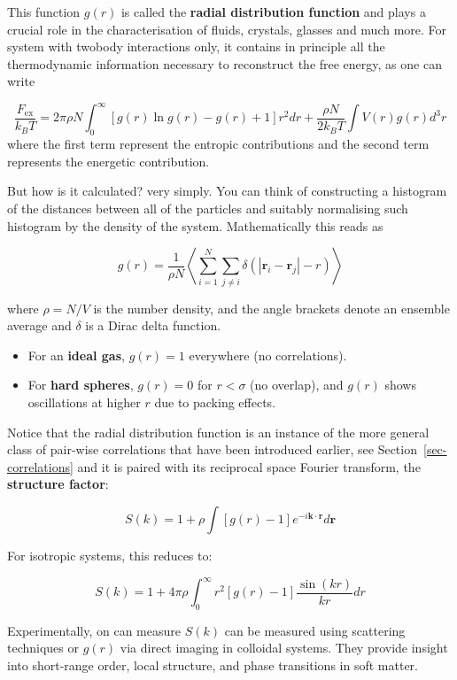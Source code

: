 \documentclass[
  letterpaper,
  enabledeprecatedfontcommands]{report}
\providecommand{\tightlist}{%
  \setlength{\itemsep}{0pt}\setlength{\parskip}{0pt}}
\begin{document}
This function \(g(r)\) is called the \textbf{radial distribution
function} and plays a crucial role in the characterisation of fluids,
crystals, glasses and much more. For system with twobody interactions
only, it contains in principle all the thermodynamic information
necessary to reconstruct the free energy, as one can write

\[
\frac{F_{\mathrm{ex}}}{k_B T}=2 \pi \rho N \int_0^{\infty}[g(r) \ln g(r)-g(r)+1] r^2 d r+\frac{\rho N}{2 k_B T} \int V(r) g(r) d^3 r
\] where the first term represent the entropic contributions and the
second term represents the energetic contribution.

But how is it calculated? very simply. You can think of constructing a
histogram of the distances between all of the particles and suitably
normalising such histogram by the density of the system. Mathematically
this reads as

\[
g(r) = \frac{1}{\rho N} \left\langle \sum_{i=1}^N \sum_{j \neq i} \delta(|\mathbf{r}_i - \mathbf{r}_j| - r) \right\rangle
\]

where \(\rho = N/V\) is the number density, and the angle brackets
denote an ensemble average and \(\delta\) is a Dirac delta function.

\begin{itemize}
\tightlist
\item
  For an \textbf{ideal gas}, \(g(r) = 1\) everywhere (no correlations).
\item
  For \textbf{hard spheres}, \(g(r) = 0\) for \(r < \sigma\) (no
  overlap), and \(g(r)\) shows oscillations at higher \(r\) due to
  packing effects.
\end{itemize}

Notice that the radial distribution function is an instance of the more
general class of pair-wise correlations that have been introduced
earlier, see Section~\ref{sec-correlations} and it is paired with its
reciprocal space Fourier transform, the \textbf{structure factor}:

\[
S(k) = 1 + \rho \int \left[ g(r) - 1 \right] e^{-i \mathbf{k} \cdot \mathbf{r}} d\mathbf{r}
\]

For isotropic systems, this reduces to:

\[
S(k) = 1 + 4\pi \rho \int_0^\infty r^2 [g(r) - 1] \frac{\sin(kr)}{kr} dr
\]

Experimentally, on can measure \(S(k)\) can be measured using scattering
techniques or \(g(r)\) via direct imaging in colloidal systems. They
provide insight into short-range order, local structure, and phase
transitions in soft matter.
\end{document}

